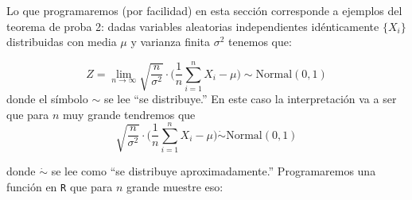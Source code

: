 \documentclass[
]{book}
\begin{document}
Lo que programaremos (por facilidad) en esta sección corresponde a ejemplos del teorema de proba 2: dadas variables aleatorias independientes idénticamente \(\{X_i\}\) distribuidas con media \(\mu\) y varianza finita \(\sigma^2\) tenemos que:

\[
Z =\lim_{n \to \infty} \sqrt{\dfrac{n}{\sigma^2}} \cdot  \Big( \frac{1}{n}\sum_{i = 1}^n X_i - \mu\Big) \sim \textrm{Normal}(0,1)
\]
donde el símbolo \(\sim\) se lee ``se distribuye.'' En este caso la interpretación va a ser que para \(n\) muy grande tendremos que
\[
\sqrt{\dfrac{n}{\sigma^2}} \cdot  \Big( \frac{1}{n}\sum_{i = 1}^n X_i - \mu\Big) \mathrel{\dot\sim} \textrm{Normal}(0,1)
\]

donde \(\mathrel{\dot\sim}\) se lee como ``se distribuye aproximadamente.'' Programaremos una función en \texttt{R} que para \(n\) grande muestre eso:
\end{document}
